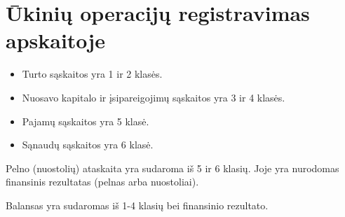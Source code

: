 \section{Ūkinių operacijų registravimas apskaitoje}


\begin{itemize}
  \item Turto sąskaitos yra 1 ir 2 klasės.
  \item Nuosavo kapitalo ir įsipareigojimų sąskaitos yra 3 ir 4 klasės.
  \item Pajamų sąskaitos yra 5 klasė.
  \item Sąnaudų sąskaitos yra 6 klasė.
\end{itemize}

Pelno (nuostolių) ataskaita yra sudaroma iš 5 ir 6 klasių. Joje yra
nurodomas finansinis rezultatas (pelnas arba nuostoliai).

Balansas yra sudaromas iš 1-4 klasių bei finansinio rezultato.
